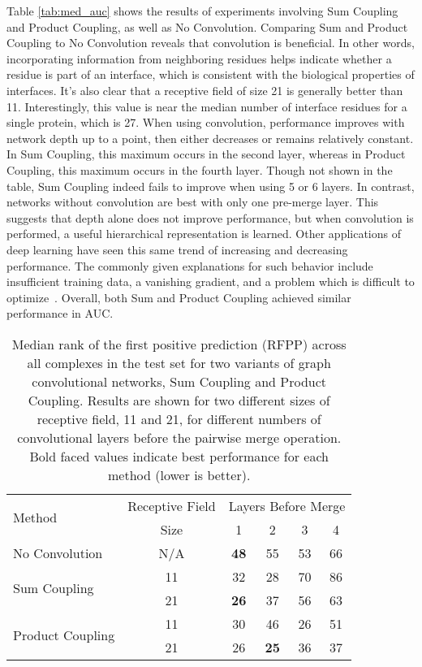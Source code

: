 Table \ref{tab:med_auc} shows the results of experiments involving Sum Coupling and Product Coupling, as well as No Convolution.
Comparing Sum and Product Coupling to No Convolution reveals that convolution is beneficial.
In other words, incorporating information from neighboring residues helps indicate whether a residue is part of an interface, which is consistent with the biological properties of interfaces.
It's also clear that a receptive field of size 21 is generally better than 11.
Interestingly, this value is near the median number of interface residues for a single protein, which is 27.
When using convolution, performance improves with network depth up to a point, then either decreases or remains relatively constant.
In Sum Coupling, this maximum occurs in the second layer, whereas in Product Coupling, this maximum occurs in the fourth layer.
Though not shown in the table, Sum Coupling indeed fails to improve when using 5 or 6 layers.
In contrast, networks without convolution are best with only one pre-merge layer.
This suggests that depth alone does not improve performance, but when convolution is performed, a useful hierarchical representation is learned.
Other applications of deep learning have seen this same trend of increasing and decreasing performance.
The commonly given explanations for such behavior include insufficient training data, a vanishing gradient, and a problem which is difficult to optimize~\cite{he2015}.
Overall, both Sum and Product Coupling achieved similar performance in AUC.

\begin{table}
	\begin{center}
		\begin{tabular}{lccccc}
			\toprule
			\multirow{2}{*}{Method} &
			Receptive Field & \multicolumn{4}{c}{Layers Before Merge} \\
			& Size & 1 & {2} & {3} & {4} \\
			\midrule
			No Convolution & N/A & \textbf{48} & 55 & 53 & 66 \\\cline{1-6}
			\multirow{2}{*}{Sum Coupling} & 11 & 32 & 28 & 70 & 86 \\
			& 21 & \textbf{26} & 37 & 56 & 63 \\\cline{1-6}
			\multirow{2}{*}{Product Coupling} & 11 & 30 & 46 & 26 & 51 \\
			& 21 & 26 & \textbf{25} & 36 & 37 \\
			\bottomrule
		\end{tabular}
		\caption{Median rank of the first positive prediction (RFPP) across all complexes in the test set for two variants of graph convolutional networks, Sum Coupling and Product Coupling. Results are shown for two different sizes of receptive field, 11 and 21, for different numbers of convolutional layers before the pairwise merge operation. Bold faced values indicate best performance for each method (lower is better).}
		\label{tab:med_rfpp}
	\end{center}
\end{table}

